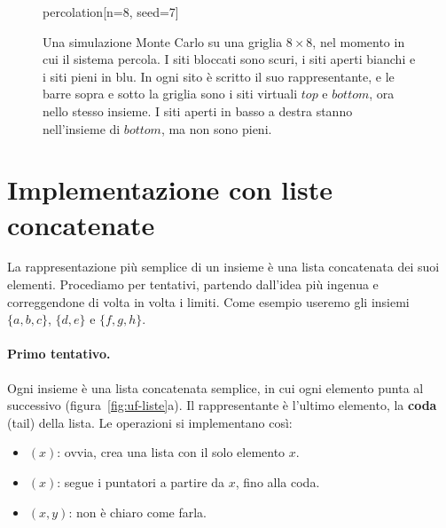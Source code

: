 \begin{figure}[htbp]
\begin{widget}{percolation}[n=8, seed=7]
\end{widget}
\caption{Una simulazione Monte Carlo su una griglia $8 \times 8$, nel momento in cui il sistema percola. I siti bloccati sono scuri, i siti aperti bianchi e i siti pieni in blu. In ogni sito è scritto il suo rappresentante, e le barre sopra e sotto la griglia sono i siti virtuali $\mathit{top}$ e $\mathit{bottom}$, ora nello stesso insieme. I siti aperti in basso a destra stanno nell'insieme di $\mathit{bottom}$, ma non sono pieni.}
\label{fig:uf-percolazione}
\end{figure}

\section{Implementazione con liste concatenate}\label{sec:uf-liste}
La rappresentazione più semplice di un insieme è una lista concatenata dei suoi elementi. Procediamo per tentativi, partendo dall'idea più ingenua e correggendone di volta in volta i limiti. Come esempio useremo gli insiemi $\{a,b,c\}$, $\{d,e\}$ e $\{f,g,h\}$.

\paragraph{Primo tentativo.}
Ogni insieme è una lista concatenata semplice, in cui ogni elemento punta al successivo (figura~\ref{fig:uf-liste}a). Il rappresentante è l'ultimo elemento, la \textbf{coda} (tail) della lista. Le operazioni si implementano così:
\begin{itemize}
    \item \MakeSet$(x)$: ovvia, crea una lista con il solo elemento $x$.
    \item \FindSet$(x)$: segue i puntatori a partire da $x$, fino alla coda.
    \item \Union$(x,y)$: non è chiaro come farla.
\end{itemize}

